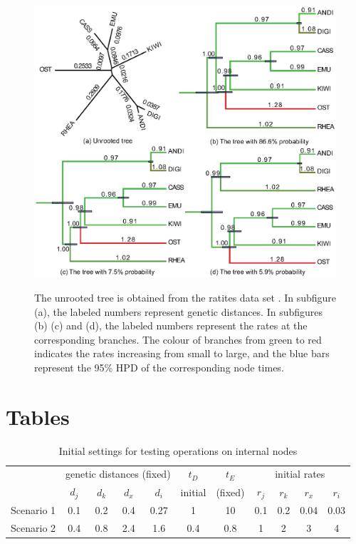 \documentclass{bmcart}
\begin{document}
\begin{backmatter}
\begin{figure}[h!]
\includegraphics[width=12cm]{Fig17-fixedtree.eps}\\
\caption{
            The unrooted tree is obtained from the ratites data set \cite{cooper2001complete}. In subfigure (a), the labeled numbers represent genetic distances. In subfigures (b) (c) and (d), the labeled numbers represent the rates at the corresponding branches. The colour of branches from green to red indicates the rates increasing from small to large, and the blue bars represent the 95\% HPD of the corresponding node times.}
\label{withoutdata}
\end{figure}

\clearpage
\section*{Tables}
\begin{table}[h!]
  \centering
\begin{tabular}{c|cccc|c|c|cccc}
  \hline
&\multicolumn{4}{c|}{genetic distances (fixed)}&$t_D$&$t_E$&\multicolumn{4}{c}{initial rates}\\
&${d_j}$&${d_k}$&${d_x}$&${d_i}$&initial&(fixed)&${r_j}$&${r_k}$&${r_x}$&${r_i}$\\
\hline
Scenario 1&0.1&0.2&0.4&0.27&1&10&0.1&0.2&0.04&0.03\\
\hline
Scenario 2&0.4&0.8&2.4&1.6&0.4&0.8&1&2&3&4\\
  \hline
\end{tabular}
\caption{Initial settings for testing operations on internal nodes}\label{ini_inter}
\end{table}


\end{backmatter}
\end{document}
